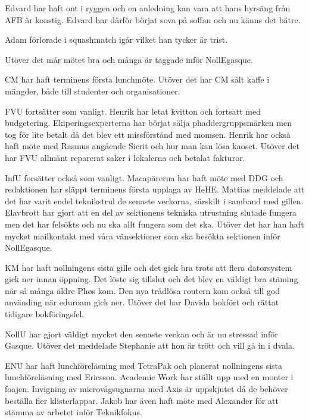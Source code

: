 \documentclass[10pt]{article}
\begin{document}
\begin{paragrafer}
\begin{fyllnadsval}

\end{fyllnadsval}

\begin{paragrafer}
Edvard har haft ont i ryggen och en anledning kan vara att hans hyrsäng från AFB är konstig. Edvard har därför börjat sova på soffan och nu känns det bätre. 

Adam förlorade i squashmatch igår vilket han tycker är trist.  

Utöver det mår mötet bra och många är taggade inför NollEgasque. 



CM har haft terminens första lunchmöte. Utöver det har CM sålt kaffe i mängder, både till studenter och organisationer. 

FVU fortsätter som vanligt. Henrik har letat kvitton och fortsatt med budgetering. Ekiperingsexperterna har börjat sälja phaddergruppsmärken men tog för lite betalt då det blev ett missförstånd med momsen. 
Henrik har också haft möte med Rasmus angående Sicrit och hur man kan lösa kaoset. 
Utöver det har FVU allmänt reparerat saker i lokalerna och betalat fakturor. 

InfU forsätter också som vanligt. Macapärerna har haft möte med DDG och redaktionen har släppt terminens första upplaga av HeHE. 
Mattias meddelade att det har varit endel teknikstrul de senaste veckorna, särskilt i samband med gillen. Elavbrott har gjort att en del av sektionens tekniska utrustning slutade fungera men det har felsökts och nu ska allt fungera som det ska. 
Utöver det har han haft mycket mailkontakt med våra vänsektioner som ska besökta sektionen inför NollEgasque. 

KM har haft nollningens sista gille och det gick bra trots att flera datorsystem gick ner innan öppning. 
Det löste sig tillslut och det blev en väldigt bra stäming när så många äldre Phøs kom. 
Den nya trådlösa routern kom också till god använding när eduroam gick ner. Utöver det har Davida bokfört och rättat tidigare bokföringsfel. 


NollU har gjort väldigt mycket den senaste veckan och är nu stressad inför Gasque. Utöver det meddelade Stephanie att hon är trött och vill gå in i dvala. 

ENU har haft lunchföreläsning med TetraPak och planerat nollningens sista lunchföreläsning med Ericsson. Academic Work har ställt upp med en monter i foajen. Invigning av microvågsugnarna med Axis är uppskjutet då de behöver beställa fler klisterlappar. 
Jakob har även haft möte med Alexander för att stämma av arbetet inför Teknikfokus. 


\end{paragrafer}
\end{paragrafer}
\end{document}
